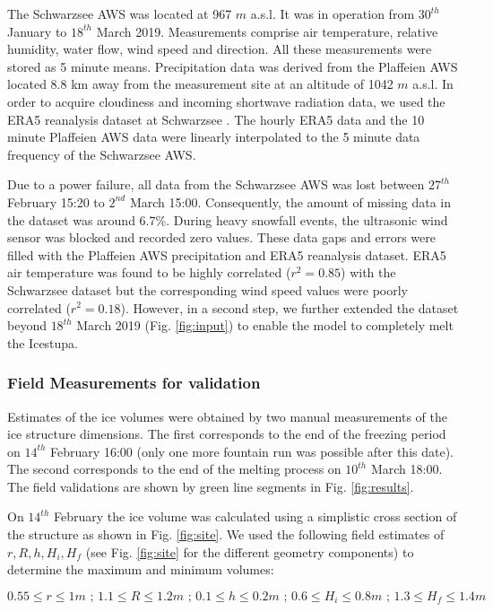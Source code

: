 \documentclass[utf8]{frontiersSCNS} %
\begin{document}
The Schwarzsee AWS was located at 967 $m$ a.s.l. It was in operation from
$30^{th}$  January to $18^{th}$ March 2019. Measurements comprise air
temperature, relative humidity, water flow, wind speed and direction. All
these measurements were stored as 5 minute means. Precipitation data was
derived from the Plaffeien AWS \citep{meteoswiss} located 8.8 km away from the
measurement site at an altitude of 1042 $m$ a.s.l. In order to acquire
cloudiness and incoming shortwave radiation data, we used the ERA5 reanalysis
dataset at Schwarzsee \citep{era5}. The hourly ERA5 data and the 10 minute
Plaffeien AWS data were linearly interpolated to the 5 minute data frequency
of the Schwarzsee AWS. 

Due to a power failure, all data from the Schwarzsee AWS was lost between
$27^{th}$ February 15:20 to $2^{nd}$ March 15:00. Consequently, the amount of
missing data in the dataset was around 6.7\%.  During heavy snowfall events,
the ultrasonic wind sensor was blocked and recorded zero values. These data
gaps and errors were filled with the  Plaffeien AWS precipitation and ERA5
reanalysis dataset. ERA5 air temperature was found to be highly correlated
($r^2 = 0.85$) with the Schwarzsee dataset but the corresponding wind speed
values were poorly correlated ($r^2 = 0.18$). However, in a second step, we
further extended the dataset beyond $18^{th}$ March 2019 (Fig.
\ref{fig:input}) to enable the model to completely melt the Icestupa.

\subsubsection{Field Measurements for validation}
\label{section:validation}
Estimates of the ice volumes were obtained by two manual measurements of the
ice structure dimensions. The first corresponds to the end of the freezing
period on $14^{th}$ February 16:00 (only one more fountain run was possible
after this date). The second corresponds to the end of the melting process on
$10^{th}$ March 18:00. The field validations are shown by green line segments
in Fig. \ref{fig:results}.

On $14^{th}$ February the ice volume was calculated using a simplistic cross
section of the structure as shown in Fig. \ref{fig:site}. We used the
following field estimates of $r, R, h, H_i, H_f$ (see Fig. \ref{fig:site} for
the different geometry components) to determine the maximum and minimum
volumes:

\begin{equation}
    0.55\leq r\leq 1 m\textit{ ; }1.1\leq R\leq 1.2 m\textit{ ; }0.1\leq h\leq 0.2 m\textit{ ; }0.6\leq H_i\leq 0.8 m\textit{ ; }1.3\leq H_f\leq 1.4 m
\end{equation}
\end{document}
